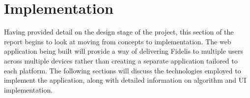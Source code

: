 \chapter{Implementation}
\label{Chapter:Implementation}
Having provided detail on the design stage of the project, this section of the report begins to look at moving from concepts to implementation. The web application being built will provide a way of delivering Fidelis to multiple users across multiple devices rather than creating a separate application tailored to each platform. The following sections will discuss the technologies employed to implement the application, along with detailed information on algorithm and UI implementation.








